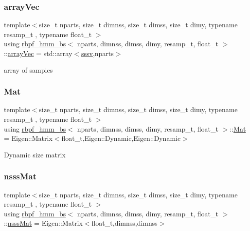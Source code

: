 \subsubsection{\texorpdfstring{array\+Vec}{arrayVec}}
{\footnotesize\ttfamily template$<$size\+\_\+t nparts, size\+\_\+t dimnss, size\+\_\+t dimss, size\+\_\+t dimy, typename resamp\+\_\+t , typename float\+\_\+t $>$ \\
using \hyperlink{classrbpf__hmm__bs}{rbpf\+\_\+hmm\+\_\+bs}$<$ nparts, dimnss, dimss, dimy, resamp\+\_\+t, float\+\_\+t $>$\+::\hyperlink{classrbpf__hmm__bs_a073f5b7f5015d394259510b20f693a19}{array\+Vec} =  std\+::array$<$\hyperlink{classrbpf__hmm__bs_a9a1c8d64f693a34a902dbfcb009d0f96}{sssv},nparts$>$}

array of samples \mbox{\label{classrbpf__hmm__bs_aa0bd79c7ece59908ed08c51da3d67dad}} 
\subsubsection{\texorpdfstring{Mat}{Mat}}
{\footnotesize\ttfamily template$<$size\+\_\+t nparts, size\+\_\+t dimnss, size\+\_\+t dimss, size\+\_\+t dimy, typename resamp\+\_\+t , typename float\+\_\+t $>$ \\
using \hyperlink{classrbpf__hmm__bs}{rbpf\+\_\+hmm\+\_\+bs}$<$ nparts, dimnss, dimss, dimy, resamp\+\_\+t, float\+\_\+t $>$\+::\hyperlink{classrbpf__hmm__bs_aa0bd79c7ece59908ed08c51da3d67dad}{Mat} =  Eigen\+::\+Matrix$<$float\+\_\+t,Eigen\+::\+Dynamic,Eigen\+::\+Dynamic$>$}

Dynamic size matrix \mbox{\label{classrbpf__hmm__bs_aa6ea87fa04659348fa4e4a52b97edc5c}} 
\subsubsection{\texorpdfstring{nsss\+Mat}{nsssMat}}
{\footnotesize\ttfamily template$<$size\+\_\+t nparts, size\+\_\+t dimnss, size\+\_\+t dimss, size\+\_\+t dimy, typename resamp\+\_\+t , typename float\+\_\+t $>$ \\
using \hyperlink{classrbpf__hmm__bs}{rbpf\+\_\+hmm\+\_\+bs}$<$ nparts, dimnss, dimss, dimy, resamp\+\_\+t, float\+\_\+t $>$\+::\hyperlink{classrbpf__hmm__bs_aa6ea87fa04659348fa4e4a52b97edc5c}{nsss\+Mat} =  Eigen\+::\+Matrix$<$float\+\_\+t,dimnss,dimnss$>$}

